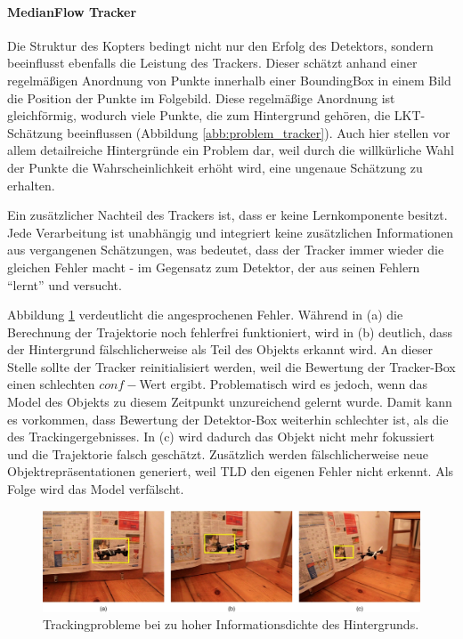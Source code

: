 	\paragraph{MedianFlow Tracker}
	Die Struktur des Kopters bedingt nicht nur den Erfolg des Detektors, sondern beeinflusst ebenfalls die Leistung des Trackers. Dieser schätzt anhand einer regelmäßigen Anordnung von Punkte innerhalb einer BoundingBox in einem Bild die Position der Punkte im Folgebild. Diese regelmäßige Anordnung ist gleichförmig, wodurch viele Punkte, die zum Hintergrund gehören, die LKT-Schätzung beeinflussen (Abbildung \ref{abb:problem_tracker}). Auch hier stellen vor allem detailreiche Hintergründe ein Problem dar, weil durch die willkürliche Wahl der Punkte die Wahrscheinlichkeit erhöht wird, eine ungenaue Schätzung zu erhalten.

	Ein zusätzlicher Nachteil des Trackers ist, dass er keine Lernkomponente besitzt. Jede Verarbeitung ist unabhängig und integriert keine zusätzlichen Informationen aus vergangenen Schätzungen, was bedeutet, dass der Tracker immer wieder die gleichen Fehler macht - im Gegensatz zum Detektor, der aus seinen Fehlern ``lernt'' und versucht.

	Abbildung \ref{abb:problem_background_1} verdeutlicht die angesprochenen Fehler. Während in (a) die Berechnung der Trajektorie noch fehlerfrei funktioniert, wird in (b) deutlich, dass der Hintergrund fälschlicherweise als Teil des Objekts erkannt wird. An dieser Stelle sollte der Tracker reinitialisiert werden, weil die Bewertung der Tracker-Box einen schlechten $conf-$Wert ergibt. Problematisch wird es jedoch, wenn das Model des Objekts zu diesem Zeitpunkt unzureichend gelernt wurde. Damit kann es vorkommen, dass Bewertung der Detektor-Box weiterhin schlechter ist, als die des Trackingergebnisses. In (c) wird dadurch das Objekt nicht mehr fokussiert und die Trajektorie falsch geschätzt. Zusätzlich werden fälschlicherweise neue Objektrepräsentationen generiert, weil TLD den eigenen Fehler nicht erkennt. Als Folge wird das Model verfälscht.

	\begin{figure}[H]
		\begin{centering}
			\includegraphics[scale=0.5]{../pictures/problem_background_1.jpg}
			\caption{Trackingprobleme bei zu hoher Informationsdichte des Hintergrunds.}
			\label{abb:problem_background_1}
			\par
		\end{centering}
	\end{figure}

